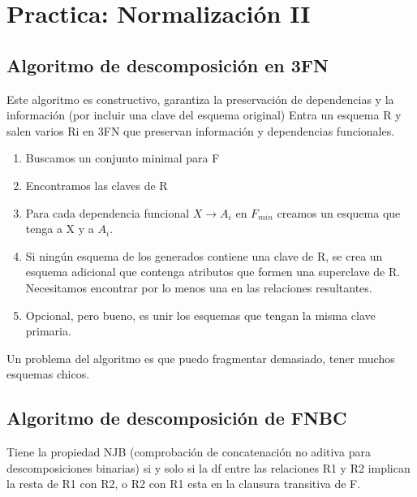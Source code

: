 \section{Practica: Normalización II}
\subsection*{Algoritmo de descomposición en 3FN}

Este algoritmo es constructivo, garantiza la preservación de dependencias y la información (por incluir una clave del esquema original)
Entra un esquema R y salen varios Ri en 3FN que preservan información y dependencias funcionales.
\begin{enumerate}
\item Buscamos un conjunto minimal para F
\item Encontramos las claves de R
\item Para cada dependencia funcional $X\rightarrow A_i$ en $F_{min}$ creamos un esquema que tenga a X y a $A_i$.
\item Si ningún esquema de los generados contiene una clave de R, se crea un esquema adicional que contenga atributos que formen una superclave de R. Necesitamos encontrar por lo menos una en las relaciones resultantes.
\item Opcional, pero bueno, es unir los esquemas que tengan la misma clave primaria.
\end{enumerate}

\medskip
Un problema del algoritmo es que puedo fragmentar demasiado, tener muchos esquemas chicos.





\subsection*{Algoritmo de descomposición de FNBC}
Tiene la propiedad NJB (comprobación de concatenación no aditiva para descomposiciones binarias) si y solo si la df entre las relaciones R1 y R2 implican la resta de R1 con R2, o R2 con R1 esta en la clausura transitiva de F.

